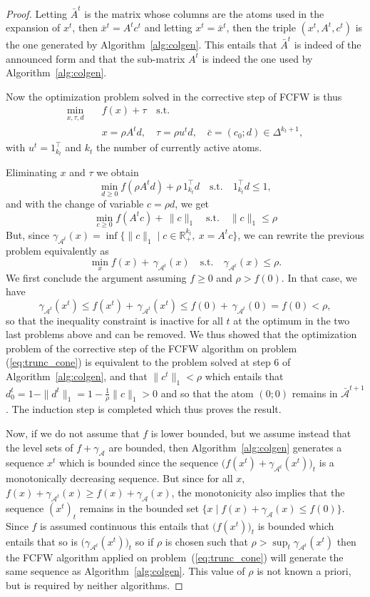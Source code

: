 \documentclass[twoside]{article}
\def\A{\mathcal{A}}
\def\RR{\mathbb{R}}
\def\st{\text{s.t.}}
\begin{document}
\begin{proof}
Letting $\bar{A}^t$ is the matrix whose columns are the atoms used in the expansion of $x^t$, 
then $\bar{x}^t=A^t c^t$ and letting $x^t=\bar{x}^t$, then the triple $({x}^t,{A}^t,{c}^t)$ is the one generated by Algorithm~\ref{alg:colgen}. This entails that 
$\bar{A}^t$ is indeed of the announced form and that the sub-matrix $A^t$ is indeed the one used by Algorithm~\ref{alg:colgen}.

Now the optimization problem solved in the corrective step of FCFW is thus
\begin{align*}
\min_{x,\tau,d} \quad &  f(x) +\tau \quad \text{s.t.} \\ 
 & x=\rho A^t d , \quad \tau=\rho u^t d , \quad \bar{c}=(c_0;d) \in \Delta^{k_t+1},
\end{align*}
with $u^t=1_{k_t}^\top$ and $k_t$ the number of currently active atoms.

Eliminating $x$ and $\tau$ we obtain
$$\min_{d \geq 0} f(\rho A^t d)+\rho \, 1_{k_t}^\top d \quad \st \quad 1_{k_t}^\top d \leq 1,$$
and with the change of variable $c=\rho d$, we get 
$$\min_{c \geq 0} f(A^t c)+ \,  \|c\|_1 \quad \st \quad \|c\|_1 \leq \rho$$
But, since $\gamma_{\A^t}(x)=\inf \big \{\|c\|_1 \mid c \in \RR^{k_t}_+, \: x=A^t c \big \}$,  we can rewrite the previous problem equivalently as
$$\min_{x } f(x)+ \,  \gamma_{\A^t}(x) \quad \st \quad \gamma_{\A^t}(x) \leq \rho.$$
We first conclude the argument assuming $f\geq 0$ and $\rho>f(0)$. In that case, we have  $$\gamma_{\A^t}(x^t) \leq  f(x^t)+ \,  \gamma_{\A^t}(x^t) \leq  f(0)+ \,  \gamma_{\A^t}(0)=f(0)<\rho,$$ so that the inequality constraint is inactive for all $t$ at the optimum in the two last problems above
and can be removed. We thus showed that the optimization problem of the corrective step of the FCFW algorithm on problem (\ref{eq:trunc_cone}) is equivalent to the problem solved at step 6 of Algorithm~\ref{alg:colgen}, and that $\|c^t\|_1< \rho$ which entails that $d_0^t=1-\|d^t\|_1=1-\frac{1}{\rho}\|c\|_1>0$ and so that the atom $(0;0)$ remains in $\bar{\A}^{t+1}$. The induction step is completed which thus proves the result.

Now, if we do not assume that $f$ is lower bounded, but we assume instead that the level sets of $f+\gamma_{\A}$ are bounded, then Algorithm~\ref{alg:colgen} generates a sequence $x^t$ which is bounded since the sequence $\big (f(x^t)+\gamma_{\A^t}(x^t) \big )_t$ is a monotonically decreasing sequence. But since for all $x$, $f(x)+\gamma_{\A^t}(x) \geq f(x)+\gamma_{\A}(x)$, the monotonicity also implies that the sequence $(x^t)_t$ remains in the bounded set $\{x \mid  f(x)+\gamma_{\A}(x) \leq f(0)\}$. Since $f$ is assumed continuous this entails that $\big (f(x^t)\big )_t$ is bounded which entails that so is $\big (\gamma_{\A^t}(x^t) \big )_t$ so if $\rho$ is chosen such that $\rho> \sup_t \gamma_{\A^t}(x^t)$ then the FCFW algorithm applied on problem~(\ref{eq:trunc_cone}) will generate the same sequence as Algorithm~\ref{alg:colgen}. This value of $\rho$ is not known a priori, but is required by neither algorithms.
\end{proof}
\end{document}
